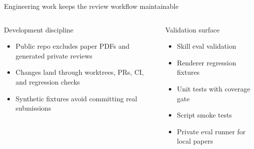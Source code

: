 \documentclass[aspectratio=169,professionalfonts]{beamer}
\begin{document}
\begin{frame}{Engineering work keeps the review workflow maintainable}
  \begin{columns}[T,onlytextwidth]
      \begin{block}{Development discipline}
        \begin{itemize}
          \item Public repo excludes paper PDFs and generated private reviews
          \item Changes land through worktrees, PRs, CI, and regression checks
          \item Synthetic fixtures avoid committing real submissions
        \end{itemize}
      \end{block}
      \begin{block}{Validation surface}
        \begin{itemize}
          \item Skill eval validation
          \item Renderer regression fixtures
          \item Unit tests with coverage gate
          \item Script smoke tests
          \item Private eval runner for local papers
        \end{itemize}
      \end{block}
  \end{columns}

\end{frame}
\end{document}
